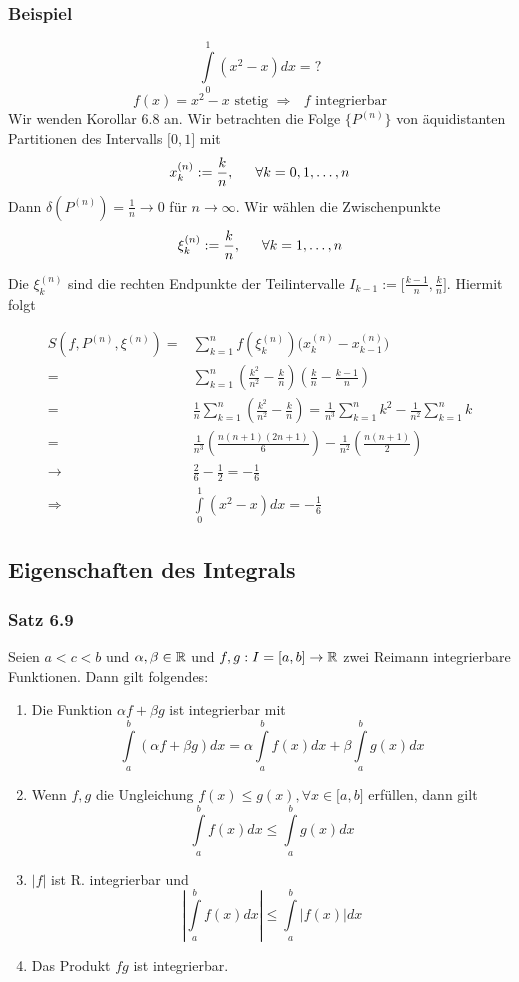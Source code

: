 \subsubsection*{Beispiel}
\[\int\limits_0^1 {({x^2} - x)dx = ?} \]
$$f(x) = {x^2} - x \text{ stetig }\Rightarrow\text{ $f$ integrierbar}$$
Wir wenden Korollar 6.8 an. Wir betrachten die Folge $\{ P^{(n)}\}$ von äquidistanten Partitionen des Intervalls $\lbrack 0,1\rbrack$ mit \[x_k^{(n)}: = \frac{k}{n},\text{\indent}\forall k = 0,1, \ldots ,n\]
Dann $\delta(P^{(n)})=\frac{1}{n}\to 0$ für $n\to\infty$. Wir wählen die Zwischenpunkte
\[\xi _k^{(n)}: = \frac{k}{n},\text{\indent}\forall k = 1, \ldots ,n\]

Die $\xi _k^{(n)}$ sind die rechten Endpunkte der Teilintervalle $I_{k-1}:=\lbrack \frac{k-1}{n},\frac{k}{n}\rbrack$. Hiermit folgt

\begin{align*}
S(f,{P^{(n)}},{\xi ^{(n)}}) =&\sum\limits_{k = 1}^n {f(\xi _k^{(n)})(x_k^{(n)} - x_{k - 1}^{(n)}} )\\
=&\sum\limits_{k = 1}^n {\left( {\frac{{{k^2}}}{{{n^2}}} - \frac{k}{n}} \right)\left( {\frac{k}{n} - \frac{{k - 1}}{n}} \right)} \\
=&\frac{1}{n}\sum\limits_{k = 1}^n {\left( {\frac{{{k^2}}}{{{n^2}}} - \frac{k}{n}} \right)} = \frac{1}{{{n^3}}}\sum\limits_{k = 1}^n {{k^2}}  - \frac{1}{{{n^2}}}\sum\limits_{k = 1}^n k \\
=&\frac{1}{{{n^3}}}\left( {\frac{{n(n + 1)(2n + 1)}}{6}} \right) - \frac{1}{{{n^2}}}\left( {\frac{{n(n + 1)}}{2}} \right)\\
\to&\frac{2}{6} - \frac{1}{2} =  - \frac{1}{6}\\
\Rightarrow&\int\limits_0^1 {({x^2} - x)dx =  - \frac{1}{6}}
\end{align*}

\subsection*{Eigenschaften des Integrals}
\subsubsection*{Satz 6.9}
Seien $a<c<b$ und $\alpha, \beta \in \mathbb{R}$ und $f,g:I=\lbrack a,b \rbrack\to\mathbb{R}$ zwei Reimann integrierbare Funktionen. Dann gilt folgendes:
\begin{enumerate}
\item Die Funktion $\alpha f + \beta g$ ist integrierbar mit \[\int\limits_a^b {(\alpha f + \beta g)dx = \alpha \int\limits_a^b {f(x)dx + \beta \int\limits_a^b {g(x)dx} } } \]
\item Wenn $f,g$ die Ungleichung $f(x)\leq g(x), \forall x\in\lbrack a,b\rbrack$ erfüllen, dann gilt \[\int\limits_a^b {f(x)dx \le \int\limits_a^b {g(x)dx} } \]
\item $\left| f \right|$ ist R. integrierbar und \[\left| {\int\limits_a^b {f(x)dx} } \right| \le \int\limits_a^b {\left| {f(x)} \right|dx} \]
\item Das Produkt $fg$ ist integrierbar.
\end{enumerate}

